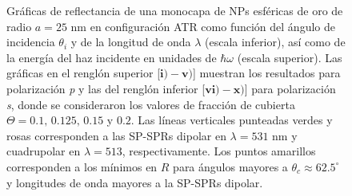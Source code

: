 	\begin{figure}[t!]\centering
{}\vspace*{-.5em}
	\caption{Gráficas de reflectancia de una monocapa de NPs esféricas de oro de radio $a=25$ nm en configuración ATR como función del ángulo de incidencia $\theta_i$ y de la longitud de onda $\lambda$ (escala inferior), así como de la energía del haz incidente en unidades de $\hbar\omega$ (escala superior).  Las gráficas   en el renglón superior [$\mathbf{i)-v)}$] muestran los resultados para  polarización \emph{p} y las del renglón inferior  [$\mathbf{vi)-x)}$]  para polarización  \emph{s}, donde se consideraron los valores de fracción de cubierta $\Theta =  0.1,\,0.125,\,0.15$ y $0.2$.  Las líneas verticales punteadas verdes y rosas corresponden a las SP-SPRs dipolar en $\lambda=531$ nm y  cuadrupolar en $\lambda=513$, respectivamente.  Los puntos amarillos corresponden a los mínimos en $R$ para ángulos mayores a $\theta_c\approx 62.5^\circ$ y longitudes de onda mayores a la SP-SPRs dipolar.
}	\label{fig:Au-R-Theta}	
	\end{figure}	

